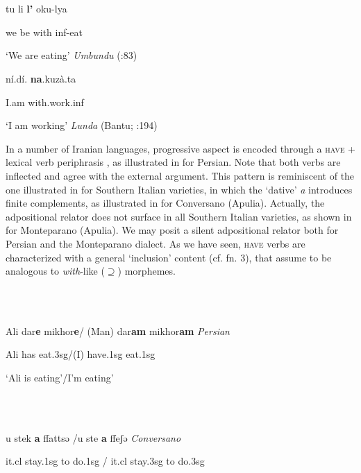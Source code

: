 \documentclass[output=paper]{langsci/langscibook}
\begin{document}
\ea%
    \label{ex:key:13}
    \gll\\
        \\
    \glt
    \z

           tu   li   \textbf{l’}   oku-lya 

we  be  with  inf-eat

‘We are eating’  \textit{Umbundu}   (\citealt{HeineKuteva2002}:83)

   ní.dí.   \textbf{na}.kuzà.ta

I.am  with.work.inf     

‘I am working’     \textit{Lunda} (Bantu; \citealt{Kawasha2003}:194)

In a number of Iranian languages, progressive aspect is encoded through a \textsc{have} + lexical verb periphrasis \citep[556]{Cinque2017}, as illustrated in  for Persian. Note that both verbs are inflected and agree with the external argument. This pattern is reminiscent of the one illustrated in \citet{ManziniEtAl2017} for Southern Italian varieties, in which the ‘dative’ \textit{a} introduces finite complements, as illustrated in  for Conversano (Apulia). Actually, the adpositional relator does not surface in all Southern Italian varieties, as shown in  for Monteparano (Apulia). We may posit a silent adpositional relator \citep{Kayne2003} both for Persian and the Monteparano dialect. As we have seen, \textsc{have} verbs are characterized with a general ‘inclusion’ content (cf. fn. 3), that \citet{ManziniFranco2016} assume to be analogous to \textit{with}{}-like (${\supseteq}$) morphemes.

\ea%
    \label{ex:key:15}
    \gll\\
        \\
    \glt
    \z

           Ali dar\textbf{e} mikhor\textbf{e}/ (Man)   dar\textbf{am} mikhor\textbf{am}   \textit{Persian}

Ali has eat.3sg/(I)   have.1sg   eat.1sg

‘Ali is eating’/I’m eating’

\ea%
    \label{ex:key:16}
    \gll\\
        \\
    \glt
    \z

          u stek   \textbf{a}   ffattsə /u   ste   \textbf{a}  ffeʃə   \textit{Conversano} 

it.cl   stay.1sg to   do.1sg / it.cl   stay.3sg   to do.3sg
\end{document}
